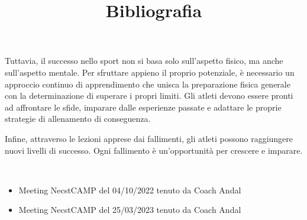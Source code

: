 \documentclass[12pt,oneside,a4paper]{article}
\begin{document}
Tuttavia, il successo nello sport non si basa solo sull'aspetto fisico, ma anche sull'aspetto mentale. Per sfruttare appieno il proprio potenziale, è necessario un approccio continuo di apprendimento che unisca la preparazione fisica generale con la determinazione di superare i propri limiti. Gli atleti devono essere pronti ad affrontare le sfide, imparare dalle esperienze passate e adattare le proprie strategie di allenamento di conseguenza. 

Infine, attraverso le lezioni apprese dai fallimenti, gli atleti possono raggiungere nuovi livelli di successo. Ogni fallimento è un'opportunità per crescere e imparare. 


\newpage
\title{\textbf{Bibliografia}} \\
\begin{itemize}
\item Meeting NecstCAMP del 04/10/2022 tenuto da Coach Andal
\item Meeting NecstCAMP del 25/03/2023 tenuto da Coach Andal
\end{itemize}
\end{document}
